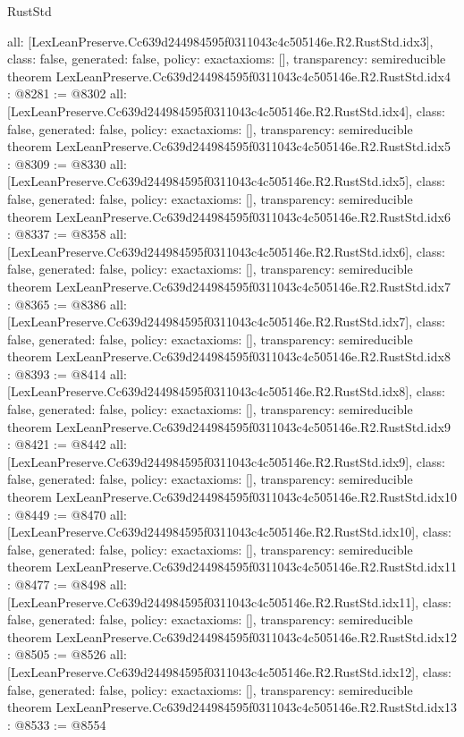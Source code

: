 \begin{lexlean}{RustStd}
\begin{coremodule}
{  all: [LexLeanPreserve.Cc639d244984595f0311043c4c505146e.R2.RustStd.idx3],
  class: false,
  generated: false,
  policy: exact{axioms: []},
  transparency: semireducible
}
theorem LexLeanPreserve.Cc639d244984595f0311043c4c505146e.R2.RustStd.idx4 : @8281 := @8302 {
  all: [LexLeanPreserve.Cc639d244984595f0311043c4c505146e.R2.RustStd.idx4],
  class: false,
  generated: false,
  policy: exact{axioms: []},
  transparency: semireducible
}
theorem LexLeanPreserve.Cc639d244984595f0311043c4c505146e.R2.RustStd.idx5 : @8309 := @8330 {
  all: [LexLeanPreserve.Cc639d244984595f0311043c4c505146e.R2.RustStd.idx5],
  class: false,
  generated: false,
  policy: exact{axioms: []},
  transparency: semireducible
}
theorem LexLeanPreserve.Cc639d244984595f0311043c4c505146e.R2.RustStd.idx6 : @8337 := @8358 {
  all: [LexLeanPreserve.Cc639d244984595f0311043c4c505146e.R2.RustStd.idx6],
  class: false,
  generated: false,
  policy: exact{axioms: []},
  transparency: semireducible
}
theorem LexLeanPreserve.Cc639d244984595f0311043c4c505146e.R2.RustStd.idx7 : @8365 := @8386 {
  all: [LexLeanPreserve.Cc639d244984595f0311043c4c505146e.R2.RustStd.idx7],
  class: false,
  generated: false,
  policy: exact{axioms: []},
  transparency: semireducible
}
theorem LexLeanPreserve.Cc639d244984595f0311043c4c505146e.R2.RustStd.idx8 : @8393 := @8414 {
  all: [LexLeanPreserve.Cc639d244984595f0311043c4c505146e.R2.RustStd.idx8],
  class: false,
  generated: false,
  policy: exact{axioms: []},
  transparency: semireducible
}
theorem LexLeanPreserve.Cc639d244984595f0311043c4c505146e.R2.RustStd.idx9 : @8421 := @8442 {
  all: [LexLeanPreserve.Cc639d244984595f0311043c4c505146e.R2.RustStd.idx9],
  class: false,
  generated: false,
  policy: exact{axioms: []},
  transparency: semireducible
}
theorem LexLeanPreserve.Cc639d244984595f0311043c4c505146e.R2.RustStd.idx10 : @8449 := @8470 {
  all: [LexLeanPreserve.Cc639d244984595f0311043c4c505146e.R2.RustStd.idx10],
  class: false,
  generated: false,
  policy: exact{axioms: []},
  transparency: semireducible
}
theorem LexLeanPreserve.Cc639d244984595f0311043c4c505146e.R2.RustStd.idx11 : @8477 := @8498 {
  all: [LexLeanPreserve.Cc639d244984595f0311043c4c505146e.R2.RustStd.idx11],
  class: false,
  generated: false,
  policy: exact{axioms: []},
  transparency: semireducible
}
theorem LexLeanPreserve.Cc639d244984595f0311043c4c505146e.R2.RustStd.idx12 : @8505 := @8526 {
  all: [LexLeanPreserve.Cc639d244984595f0311043c4c505146e.R2.RustStd.idx12],
  class: false,
  generated: false,
  policy: exact{axioms: []},
  transparency: semireducible
}
theorem LexLeanPreserve.Cc639d244984595f0311043c4c505146e.R2.RustStd.idx13 : @8533 := @8554 {
}
\end{coremodule}
\end{lexlean}
